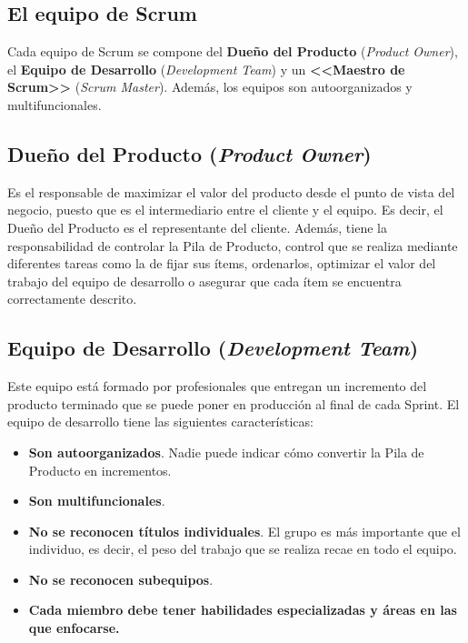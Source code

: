 \newpage

\subsection{El equipo de Scrum}
Cada equipo de Scrum \cite{Schwaber2017} se compone del \textbf{Dueño del Producto} (\textit{Product Owner}), el \textbf{Equipo de Desarrollo} (\textit{Development Team}) y un \textbf{<<Maestro de Scrum>>} (\textit{Scrum Master}). Además, los equipos son autoorganizados y multifuncionales.

\subsection*{Dueño del Producto (\textit{Product Owner})}
Es el responsable de maximizar el valor del producto desde el punto de vista del negocio, puesto que es el intermediario entre el cliente y el equipo. Es decir, el Dueño del Producto es el representante del cliente. Además, tiene la responsabilidad de controlar la Pila de Producto, control que se realiza mediante diferentes tareas como la de fijar sus ítems, ordenarlos, optimizar el valor del trabajo del equipo de desarrollo o asegurar que cada ítem se encuentra correctamente descrito.

\subsection*{Equipo de Desarrollo (\textit{Development Team})}
Este equipo está formado por profesionales que entregan un incremento del producto terminado que se puede poner en producción al final de cada Sprint. El equipo de desarrollo tiene las siguientes características:


\begin{itemize}
	\item \textbf{Son autoorganizados}. Nadie puede indicar cómo convertir la Pila de Producto en incrementos.
	\item \textbf{Son multifuncionales}.
	\item \textbf{No se reconocen títulos individuales}. El grupo es más importante que el individuo, es decir, el peso del trabajo que se realiza recae en todo el equipo.
	\item \textbf{No se reconocen subequipos}.
	\item \textbf{Cada miembro debe tener habilidades especializadas y áreas en las que enfocarse.}
\end{itemize}

